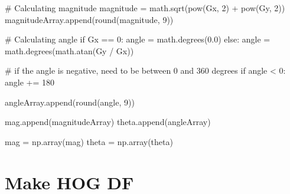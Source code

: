 \documentclass[
  letterpaper,
  DIV=11,
  numbers=noendperiod]{scrreprt}
\newenvironment{Shaded}{\begin{snugshade}}{\end{snugshade}}
\newcommand{\BuiltInTok}[1]{\textcolor[rgb]{0.00,0.23,0.31}{#1}}
\newcommand{\CommentTok}[1]{\textcolor[rgb]{0.37,0.37,0.37}{#1}}
\newcommand{\ControlFlowTok}[1]{\textcolor[rgb]{0.00,0.23,0.31}{#1}}
\newcommand{\DecValTok}[1]{\textcolor[rgb]{0.68,0.00,0.00}{#1}}
\newcommand{\FloatTok}[1]{\textcolor[rgb]{0.68,0.00,0.00}{#1}}
\newcommand{\FunctionTok}[1]{\textcolor[rgb]{0.28,0.35,0.67}{#1}}
\newcommand{\NormalTok}[1]{\textcolor[rgb]{0.00,0.23,0.31}{#1}}
\newcommand{\OperatorTok}[1]{\textcolor[rgb]{0.37,0.37,0.37}{#1}}
\newcommand{\SpecialCharTok}[1]{\textcolor[rgb]{0.37,0.37,0.37}{#1}}
\begin{document}
\begin{Shaded}
\begin{Highlighting}[]
        \CommentTok{\# Calculating magnitude}
\NormalTok{        magnitude }\OperatorTok{=}\NormalTok{ math.sqrt(}\BuiltInTok{pow}\NormalTok{(Gx, }\DecValTok{2}\NormalTok{) }\OperatorTok{+} \BuiltInTok{pow}\NormalTok{(Gy, }\DecValTok{2}\NormalTok{))}
\NormalTok{        magnitudeArray.append(}\BuiltInTok{round}\NormalTok{(magnitude, }\DecValTok{9}\NormalTok{))}

        \CommentTok{\# Calculating angle}
        \ControlFlowTok{if}\NormalTok{ Gx }\OperatorTok{==} \DecValTok{0}\NormalTok{:}
\NormalTok{            angle }\OperatorTok{=}\NormalTok{ math.degrees(}\FloatTok{0.0}\NormalTok{)}
        \ControlFlowTok{else}\NormalTok{:}
\NormalTok{            angle }\OperatorTok{=}\NormalTok{ math.degrees(math.atan(Gy }\OperatorTok{/}\NormalTok{ Gx))}
            
            \CommentTok{\# if the angle is negative, need to be between 0 and 360 degrees}
            \ControlFlowTok{if}\NormalTok{ angle }\OperatorTok{\textless{}} \DecValTok{0}\NormalTok{:}
\NormalTok{                angle }\OperatorTok{+=} \DecValTok{180}

\NormalTok{        angleArray.append(}\BuiltInTok{round}\NormalTok{(angle, }\DecValTok{9}\NormalTok{))}
    
\NormalTok{    mag.append(magnitudeArray)}
\NormalTok{    theta.append(angleArray)}
\end{Highlighting}
\end{Shaded}

\begin{Shaded}
\begin{Highlighting}[]
\NormalTok{mag }\OperatorTok{=}\NormalTok{ np.array(mag)}
\NormalTok{theta }\OperatorTok{=}\NormalTok{ np.array(theta)}
\end{Highlighting}
\end{Shaded}

\hypertarget{make-hog-df}{%
\section{Make HOG DF}\label{make-hog-df}}

\begin{Shaded}
\end{Shaded}
\end{document}
